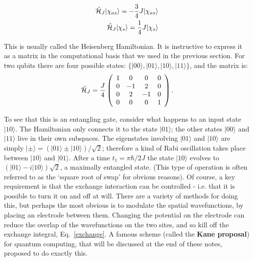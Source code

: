 \documentclass[a4paper,11pt]{article}
\newcommand{\ket}[1]{| #1 \rangle}
\newcommand{\beq}{\begin{equation}}
\newcommand{\eeq}{\end{equation}}
\newcommand{\baq}{\begin{eqnarray}}
\newcommand{\eaq}{\end{eqnarray}}
\begin{document}
\baq
{\cal \hat H}_J \ket{\chi_{as}} = -\frac{3}{4} J \ket{\chi_{as}} \nonumber\\
{\cal \hat H}_J \ket{\chi_{s}} = \frac{1}{4} J \ket{\chi_{s}}
\eaq

This is usually called the Heisenberg Hamiltonian. It is instructive to express it as a matrix in the computational basis that we used in the previous section. For two qubits there are four possible states: $\{\ket{00}, \ket{01}, \ket{10}, \ket{11}\}$, and the matrix is:
\beq 
{\cal\hat H}_J = \frac{J}{4}
\left(\begin{array}{cccc}
1 & 0 & 0 & 0 \\
0 & -1 & 2 & 0 \\
0 & 2 & -1 & 0 \\
0 & 0 & 0 & 1 
\end{array} \right).
\eeq

To see that this is an entangling gate, consider what happens to an input state $\ket{10}$. The Hamiltonian only connects it to the state $\ket{01}$; the other states $\ket{00}$ and $\ket{11}$ live in their own subspaces. The eigenstates involving $\ket{01}$ and $\ket{10}$ are simply $\ket{\pm} = (\ket{01} \pm \ket{10})/\sqrt{2}$; therefore a kind of Rabi oscillation takes place between $\ket{10}$ and $\ket{01}$. After a time $t_1 = \pi\hbar/2J$ the state $\ket{10}$ evolves to $(\ket{01} - i \ket{10} )\sqrt{2}$, a maximally entangled state. (This type of operation is often referred to as the `square root of swap' for obvious reasons). Of course, a key requirement is that the exchange interaction can be controlled - i.e. that it is possible to turn it on and off at will. There are a variety of methods for doing this, but perhaps the most obvious is to modulate the spatial wavefunctions, by placing an electrode between them. Changing the potential on the electrode can reduce the overlap of the wavefunctions on the two sites, and so kill off the exchange integral, Eq.~\ref{exchange}. A famous scheme (called the {\bf Kane proposal}) for quantum computing, that will be discussed at the end of these notes, proposed to do exactly this.
\end{document}
